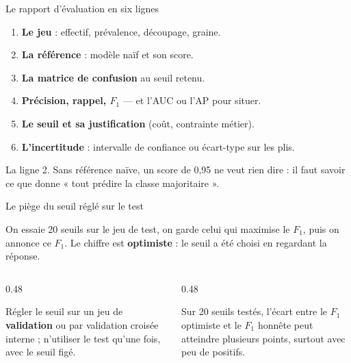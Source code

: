 \begin{frame}{Le rapport d'évaluation en six lignes}
\begin{enumerate}
  \item \textbf{Le jeu} : effectif, prévalence, découpage, graine.
  \item \textbf{La référence} : modèle naïf et son score.
  \item \textbf{La matrice de confusion} au seuil retenu.
  \item \textbf{Précision, rappel, $F_1$} --- et l'AUC ou l'AP pour situer.
  \item \textbf{Le seuil et sa justification} (coût, contrainte métier).
  \item \textbf{L'incertitude} : intervalle de confiance ou écart-type sur les plis.
\end{enumerate}
\vspace{1.5mm}
\begin{wbox}
La ligne 2. Sans référence naïve, un score de 0,95 ne veut rien dire : il faut
savoir ce que donne « tout prédire la classe majoritaire ».
\end{wbox}
\end{frame}

\begin{frame}{Le piège du seuil réglé sur le test}
\begin{wbox}[Le scénario]
On essaie 20 seuils sur le jeu de test, on garde celui qui maximise le $F_1$,
puis on annonce ce $F_1$. Le chiffre est \textbf{optimiste} : le seuil a été
choisi en regardant la réponse.
\end{wbox}
\begin{columns}[t]
\begin{column}{0.48\textwidth}
\begin{solbox}
Régler le seuil sur un jeu de \textbf{validation} ou par validation croisée
interne ; n'utiliser le test qu'une fois, avec le seuil figé.
\end{solbox}
\end{column}
\begin{column}{0.48\textwidth}
\begin{kbox}
Sur 20 seuils testés, l'écart entre le $F_1$ optimiste et le $F_1$ honnête peut
atteindre plusieurs points, surtout avec peu de positifs.
\end{kbox}
\end{column}
\end{columns}
\end{frame}

